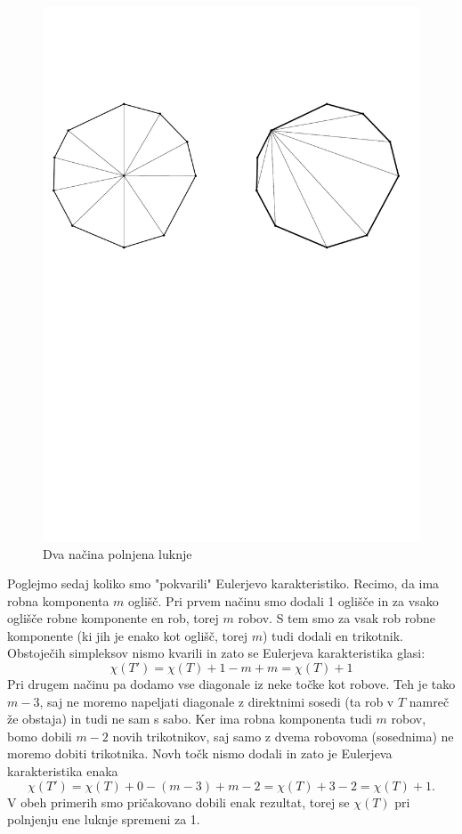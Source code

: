 \documentclass{article}
\begin{document}
\begin{figure}[htb]
\begin{center}
\includegraphics[scale=0.5]{luknje.pdf}
\caption{Dva načina polnjena luknje}
\label{luknje}
\end{center}
\end{figure}

Poglejmo sedaj koliko smo "pokvarili" Eulerjevo karakteristiko. Recimo, da ima robna komponenta $m$ oglišč. Pri prvem načinu smo dodali 1 oglišče in za vsako oglišče robne komponente en rob, torej $m$ robov. S tem smo za vsak rob robne komponente (ki jih je enako kot oglišč, torej $m$) tudi dodali en trikotnik. Obstoječih simpleksov nismo kvarili in zato se Eulerjeva karakteristika glasi:
$$\chi(T')=\chi(T) + 1 - m + m = \chi(T) + 1$$
Pri drugem načinu pa dodamo vse diagonale iz neke točke kot robove. Teh je tako $m-3$, saj ne moremo napeljati diagonale z direktnimi sosedi (ta rob v $T$ namreč že obstaja) in tudi ne sam s sabo. Ker ima robna komponenta tudi $m$ robov, bomo dobili $m-2$ novih trikotnikov, saj samo z dvema robovoma (sosednima) ne moremo dobiti trikotnika. Novh točk nismo dodali in zato je Eulerjeva karakteristika enaka
$$\chi(T')=\chi(T) + 0 - (m-3) + m-2 = \chi(T) + 3 - 2 = \chi(T) + 1.$$
V obeh primerih smo pričakovano dobili enak rezultat, torej se $\chi(T)$ pri polnjenju ene luknje spremeni za 1.
\end{document}
